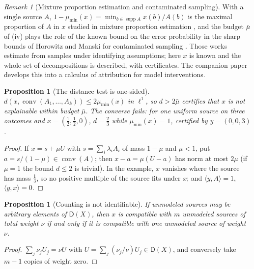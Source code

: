 \documentclass[11pt]{article}
\newtheorem{proposition}[theorem]{Proposition}
\theoremstyle{definition}
\theoremstyle{remark}
\newtheorem{remark}[theorem]{Remark}
\newcommand{\D}{\mathsf{D}}
\begin{document}
\begin{remark}[Mixture proportion estimation and contaminated sampling]
With a single source $A$, $1-\mu_{\min}(x)=\min_{b\in\operatorname{supp}A}x(b)/A(b)$ is the maximal proportion of
$A$ in $x$ studied in mixture proportion estimation \cite{Blanchard2010,Scott2015}, and the budget
$\bar\mu$ of (iv) plays the role of the known bound on the error probability in the sharp bounds of
Horowitz and Manski for contaminated sampling \cite{HorowitzManski1995}. Those works estimate from
samples under identifying assumptions; here $x$ is known and the whole set of decompositions is
described, with certificates. The companion paper \cite{Awasthi-Attribution} develops this into a
calculus of attribution for model interventions.
\end{remark}

\begin{proposition}[The distance test is one-sided]\label{prop:dist-onesided}
$d(x,\operatorname{conv}(A_1,\dots,A_k))\le2\mu_{\min}(x)$ in $\ell^1$, so $d>2\bar\mu$ certifies that
$x$ is not explainable within budget $\bar\mu$. The converse fails: for one uniform source on three
outcomes and $x=(\tfrac12,\tfrac12,0)$, $d=\tfrac23$ while $\mu_{\min}(x)=1$, certified by $y=(0,0,3)$.
\end{proposition}
\begin{proof}
If $x=s+\mu U$ with $s=\sum_i\lambda_iA_i$ of mass $1-\mu$ and $\mu<1$, put $a=s/(1-\mu)\in
\operatorname{conv}(A)$; then $x-a=\mu(U-a)$ has norm at most $2\mu$ (if $\mu=1$ the bound $d\le2$ is
trivial). In the example, $x$ vanishes where the source has mass $\tfrac13$, so no positive multiple of
the source fits under $x$; and $\langle y,A\rangle=1$, $\langle y,x\rangle=0$.
\end{proof}

\begin{proposition}[Counting is not identifiable]\label{prop:counting}
If unmodeled sources may be arbitrary elements of $\D(X)$, then $x$ is compatible with $m$ unmodeled
sources of total weight $\nu$ if and only if it is compatible with one unmodeled source of weight $\nu$.
\end{proposition}
\begin{proof}
$\sum_j\nu_jU_j=\nu U$ with $U=\sum_j(\nu_j/\nu)U_j\in\D(X)$, and conversely take $m-1$ copies of weight
zero.
\end{proof}
\end{document}
